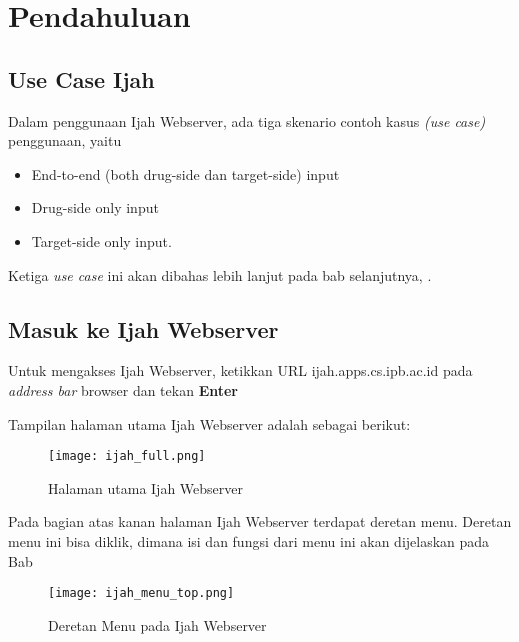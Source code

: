 \chapter{Pendahuluan}


\section{Use Case Ijah}
Dalam penggunaan Ijah Webserver, ada tiga skenario contoh kasus \emph{(use case)} penggunaan, yaitu
\begin{itemize}
\item End-to-end (both drug-side dan target-side) input
\item Drug-side only input
\item Target-side only input.
\end{itemize}
Ketiga \emph{use case} ini akan dibahas lebih lanjut pada bab selanjutnya, .

\section{Masuk ke Ijah Webserver}
Untuk mengakses Ijah Webserver, ketikkan URL ijah.apps.cs.ipb.ac.id pada \emph{address bar} browser dan tekan \textbf{Enter}

Tampilan halaman utama Ijah Webserver adalah sebagai berikut:

\begin{figure}[!h]
	\centering
	\texttt{[image: ijah\_full.png]}
	\caption{Halaman utama Ijah Webserver}
	\label{fig:ijah_full}
\end{figure}

Pada bagian atas kanan halaman Ijah Webserver terdapat deretan menu. Deretan menu ini bisa diklik, dimana isi dan fungsi dari menu ini akan dijelaskan pada Bab 

\begin{figure}[!h]
	\centering
	\texttt{[image: ijah\_menu\_top.png]}
	\caption{Deretan Menu pada Ijah Webserver}
	\label{fig:ijah_menu_top}
\end{figure}

